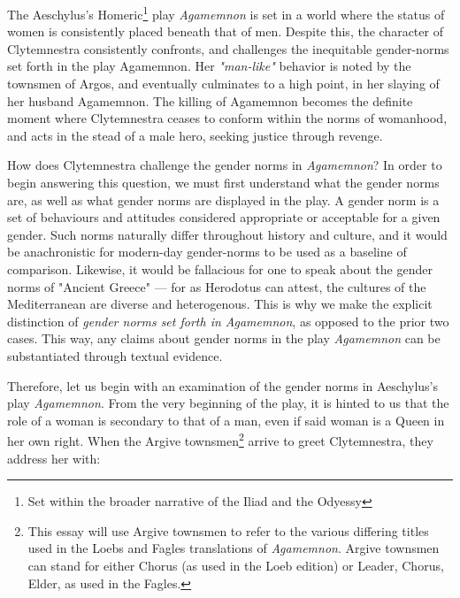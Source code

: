 
The Aeschylus's Homeric\footnote{Set within the broader narrative of the Iliad
and the Odyessy} play \emph{Agamemnon} is set in a world where the status of
women is consistently placed beneath that of men. Despite this, the character of
Clytemnestra consistently confronts, and challenges the inequitable gender-norms
set forth in the play Agamemnon. Her \emph{"man-like"} behavior is noted by the
townsmen of Argos, and eventually culminates to a high point, in her slaying of
her husband Agamemnon. The killing of Agamemnon becomes the definite moment
where Clytemnestra ceases to conform within the norms of womanhood, and acts in
the stead of a male hero, seeking justice through revenge.

\clearpage %

How does Clytemnestra challenge the gender norms in \emph{Agamemnon}? In order
to begin answering this question, we must first understand what the gender norms
are, as well as what gender norms are displayed in the play. A gender norm is a
set of behaviours and attitudes considered appropriate or acceptable for a given
gender. Such norms naturally differ throughout history and culture, and it
would be anachronistic for modern-day gender-norms to be used as a baseline
of comparison. Likewise, it would be fallacious for one to speak about the
gender norms of "Ancient Greece" --- for as Herodotus can attest, the cultures
of the Mediterranean are diverse and heterogenous. This is why we make the
explicit distinction of \emph{gender norms set forth in Agamemnon}, as opposed
to the prior two cases. This way, any claims about gender norms in the play
\emph{Agamemnon} can be substantiated through textual evidence.

Therefore, let us begin with an examination of the gender norms in Aeschylus's
play \emph{Agamemnon}. From the very beginning of the play, it is hinted to us
that the role of a woman is secondary to that of a man, even if said woman is a
Queen in her own right. When the Argive townsmen\footnote{This essay
will use Argive townsmen to refer to the various differing titles used in the
Loebs and Fagles translations of \emph{Agamemnon}. Argive townsmen can stand for
either Chorus (as used in the Loeb edition) or Leader, Chorus, Elder, as used in
the Fagles.} arrive to greet Clytemnestra, they address her with:

